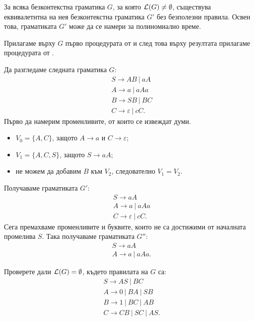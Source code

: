\begin{thm}
  За всяка безконтекстна граматика $G$, за която $\mathcal{L}(G) \neq \emptyset$, съществува еквивалетнтна на нея безконтекстна граматика $G'$ без безполезни правила.
  Освен това, граматиката $G'$ може да се намери за полиномиално време.
\end{thm}
\begin{hint}
  Прилагаме върху $G$ първо процедурата от  и след това върху резултата прилагаме процедурата от .
\end{hint}

\begin{example}
  Да разгледаме следната граматика $G$:
  \begin{align*}
    & S \to AB\ |\ aA\\
    & A \to a\ |\ aAa\\
    & B \to SB\ |\ BC\\
    & C \to \varepsilon\ |\ cC.
  \end{align*}
  Първо да намерим променливите, от които се извеждат думи.
  \begin{itemize}
  \item 
    $V_0 = \{A, C\}$, защото $A \to a$ и $C \to \varepsilon$;
  \item
    $V_1 = \{A, C, S\}$, защото $S \to aA$;
  \item
    не можем да добавим $B$ към $V_2$, следователно $V_1 = V_2$.
  \end{itemize}
  Получаваме граматиката $G'$:
  \begin{align*}
    & S \to aA\\
    & A \to a\ |\ aAa\\
    & C \to \varepsilon\ |\ cC.
  \end{align*}
  Сега премахваме променливите и буквите, които не са достижими от началната промелива $S$. Така получаваме граматиката $G''$:
  \begin{align*}
    & S \to aA\\
    & A \to a\ |\ aAa.
  \end{align*}
\end{example}

\begin{problem}
  Проверете дали $\mathcal{L}(G) = \emptyset$, където правилата на $G$ са:
  \begin{align*}
    & S \to AS\ |\ BC\\
    & A \to 0\ |\ BA\ |\ SB\\
    & B \to 1\ |\ BC\ |\ AB\\
    & C \to CB\ |\ SC\ |\ AS.
  \end{align*}
\end{problem}



